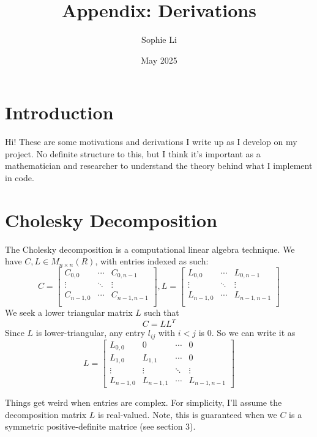 \documentclass{article}
\title{Appendix: Derivations}
\author{Sophie Li }
\date{May 2025}
\begin{document}
\maketitle

\section{Introduction}
Hi! These are some motivations and derivations I write up as I develop on my project. No definite structure to this, but I think it's important as a mathematician and researcher to understand the theory behind what I implement in code.  

\section{Cholesky Decomposition}
The Cholesky decomposition is a computational linear algebra technique. 
We have $C,L \in M_{n \times n}(R)$, with entries indexed as such: 
$$ C = \begin{bmatrix}
C_{0,0} & \cdots & C_{0,n-1} \\
\vdots & \ddots & \vdots \\
C_{n-1,0} & \cdots & C_{n-1,n-1} \\
\end{bmatrix}, L = \begin{bmatrix}
L_{0,0} & \cdots & L_{0,n-1} \\
\vdots & \ddots & \vdots \\
L_{n-1,0} & \cdots & L_{n-1,n-1} \\
\end{bmatrix}
$$
We seek a lower triangular matrix $L$ such that 
$$ C = LL^T$$
Since $L$ is lower-triangular, any entry $l_{ij}$ with $i < j$ is 0. So we can write it as 
$$ L = \begin{bmatrix}
L_{0,0} & 0        & \cdots & 0 \\
L_{1,0} & L_{1,1}  & \cdots & 0 \\
\vdots  & \vdots   & \ddots & \vdots \\
L_{n-1,0} & L_{n-1,1} & \cdots & L_{n-1,n-1}
\end{bmatrix}$$

\noindent Things get weird when entries are complex. For simplicity, I'll assume the decomposition matrix $L$ is real-valued. Note, this is guaranteed when we $C$ is a symmetric positive-definite matrice (see section 3). \bigskip
\end{document}
